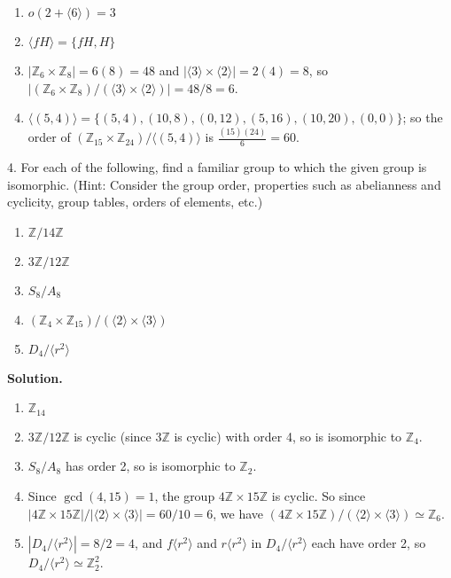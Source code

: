 \documentclass[10pt,]{book}
\theoremstyle{plain}
\theoremstyle{definition}
\theoremstyle{definition}
\theoremstyle{definition}
\theoremstyle{definition}
\numberwithin{equation}{section}
\def\Z{\mathbb{Z}}
\begin{document}
\begin{exerciselist}
\begin{enumerate}[label=(\alph*)]
\item\hypertarget{li-512}{}\(o(2+\langle 6\rangle)=3\)%
\item\hypertarget{li-513}{}\(\langle fH\rangle= \{fH, H\}\)%
\item\hypertarget{li-514}{}\(|\Z_6\times \Z_8|=6(8)=48\) and \(|\langle 3\rangle \times \langle 2\rangle|=2(4)=8\), so \(|(\Z_6\times \Z_8)/(\langle 3\rangle\times \langle 2\rangle)|=48/8=6\).%
\item\hypertarget{li-515}{}\(\langle (5,4)\rangle=\{(5,4),(10,8),(0,12),(5,16),(10,20),(0,0)\}\); so the order of \((\Z_{15} \times \Z_{24})/\langle (5,4)\rangle\) is \(\frac{(15)(24)}{6}=60\).%
\end{enumerate}
%
\item[4.]\hypertarget{exercise-62}{}For each of the following, find a familiar group to which the given group is isomorphic. (Hint: Consider the group order, properties such as abelianness and cyclicity, group tables, orders of elements, etc.) \leavevmode%
\begin{enumerate}[label=(\alph*)]
\item\hypertarget{li-516}{}\(\Z/14\Z\)%
\item\hypertarget{li-517}{}\(3\Z/12\Z\)%
\item\hypertarget{li-518}{}\(S_8/A_8\)%
\item\hypertarget{li-519}{}\((\Z_4 \times \Z_{15})/(\langle 2 \rangle \times \langle 3 \rangle )\)%
\item\hypertarget{li-520}{}\(D_4/\langle r^2 \rangle\)%
\end{enumerate}
%
\par\smallskip
\par\smallskip
\noindent\textbf{Solution.}\hypertarget{solution-62}{}\quad
\leavevmode%
\begin{enumerate}[label=(\alph*)]
\item\hypertarget{li-521}{}\(\Z_{14}\)%
\item\hypertarget{li-522}{}\(3\Z/12\Z\) is cyclic (since \(3\Z\) is cyclic) with order 4, so is isomorphic to \(\Z_4\).%
\item\hypertarget{li-523}{}\(S_8/A_8\) has order 2, so is isomorphic to \(\Z_2\).%
\item\hypertarget{li-524}{}Since \(\gcd(4,15)=1\), the group \(4\Z \times 15\Z\) is cyclic. So since \(|4\Z \times 15\Z|/|\langle 2 \rangle \times \langle 3 \rangle|=60/10=6\), we have  \((4\Z \times 15\Z)/(\langle 2 \rangle \times \langle 3 \rangle) \simeq \Z_6\).%
\item\hypertarget{li-525}{}\(|D_4/\langle r^2\rangle|=8/2=4\), and \(f\langle r^2\rangle\) and \(r\langle r^2\rangle\) in \(D_4/\langle r^2\rangle\) each have order 2, so \(D_4/\langle r^2 \rangle \simeq \Z_2^2\).%

\end{enumerate}
\end{exerciselist}
\end{document}
